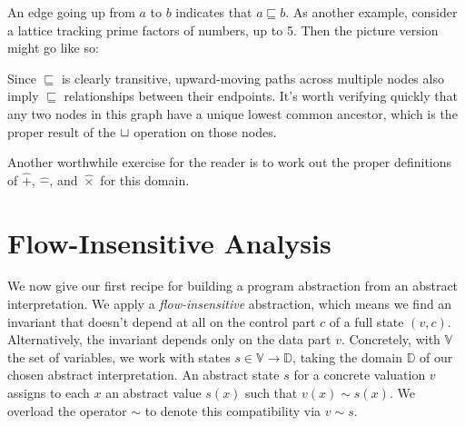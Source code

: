 \documentclass{amsbook}
\theoremstyle{definition}
\theoremstyle{remark}
\numberwithin{section}{chapter}
\numberwithin{equation}{chapter}
\begin{document}
An edge going up from $a$ to $b$ indicates that $a \sqsubseteq b$.
As another example, consider a lattice tracking prime factors of numbers, up to 5.
Then the picture version might go like so:

\begin{center}\end{center}

Since $\sqsubseteq$ is clearly transitive, upward-moving paths across multiple nodes also imply $\sqsubseteq$ relationships between their endpoints.
It's worth verifying quickly that any two nodes in this graph have a unique lowest common ancestor, which is the proper result of the $\sqcup$ operation on those nodes.

Another worthwhile exercise for the reader is to work out the proper definitions of $\hat{+}$, $\hat{-}$, and $\hat{\times}$ for this domain.


\section{Flow-Insensitive Analysis}

We now give our first recipe for building a program abstraction from an abstract interpretation.
We apply a \emph{flow-insensitive} abstraction, which means we find an invariant that doesn't depend at all on the control part $c$ of a full state $(v, c)$.
Alternatively, the invariant depends only on the data part $v$.
Concretely, with $\mathbb V$ the set of variables, we work with states $s \in \mathbb V \to \mathbb D$, taking the domain $\mathbb D$ of our chosen abstract interpretation.
An abstract state $s$ for a concrete valuation $v$ assigns to each $x$ an abstract value $s(x)$ such that $v(x) \sim s(x)$.
We overload the operator $\sim$ to denote this compatibility via $v \sim s$.
\end{document}
